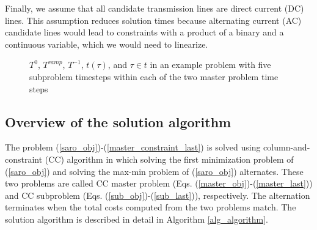 \documentclass[final]{IEEEtran}
\begin{document}
Finally, we assume that all candidate transmission lines are direct current (DC) lines. This assumption reduces solution times because alternating current (AC) candidate lines would lead to constraints with a product of a binary and a continuous variable, which we would need to linearize.

\begin{figure}[htpb]
	\caption{$T^0$, $T^{ramp}$, $T^{-1}$, $t(\tau)$, and $\tau \in t$ in an example problem with five subproblem timesteps within each of the two master problem time steps}
	\label{fig_time_scales}
\end{figure}

\subsection{Overview of the solution algorithm}

The problem (\ref{saro_obj})-(\ref{master_constraint_last}) is solved using column-and-constraint (CC) algorithm in which solving the first minimization problem of (\ref{saro_obj}) and solving the max-min problem of (\ref{saro_obj}) alternates. These two problems are called CC master problem (Eqs. (\ref{master_obj})-(\ref{master_last})) and CC subproblem (Eqs. (\ref{sub_obj})-(\ref{sub_last})), respectively. The alternation terminates when the total costs computed from the two problems match. The solution algorithm is described in detail in Algorithm \ref{alg_algorithm}.
\end{document}
